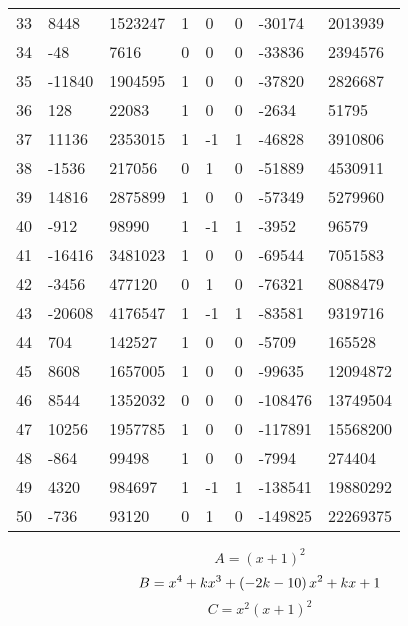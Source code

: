 \documentclass{amsart}
\begin{document}
\begin{longtable}{|l|l|l|lllll|}
33&8448&1523247&1&0&0&-30174&2013939\\
34&-48&7616&0&0&0&-33836&2394576\\
35&-11840&1904595&1&0&0&-37820&2826687\\
36&128&22083&1&0&0&-2634&51795\\
37&11136&2353015&1&-1&1&-46828&3910806\\
38&-1536&217056&0&1&0&-51889&4530911\\
39&14816&2875899&1&0&0&-57349&5279960\\
40&-912&98990&1&-1&1&-3952&96579\\
41&-16416&3481023&1&0&0&-69544&7051583\\
42&-3456&477120&0&1&0&-76321&8088479\\
43&-20608&4176547&1&-1&1&-83581&9319716\\
44&704&142527&1&0&0&-5709&165528\\
45&8608&1657005&1&0&0&-99635&12094872\\
46&8544&1352032&0&0&0&-108476&13749504\\
47&10256&1957785&1&0&0&-117891&15568200\\
48&-864&99498&1&0&0&-7994&274404\\
49&4320&984697&1&-1&1&-138541&19880292\\
50&-736&93120&0&1&0&-149825&22269375\\
\hline
\end{longtable}
$$A=(x
 + 1)^{2}$$
$$B=x^4
 + k\*x^3
 + \left(-2\*k
 - 10\right) \*x^2
 + k\*x
 + 1$$
$$C=x^2(x
 + 1)^{2}$$
\end{document}
